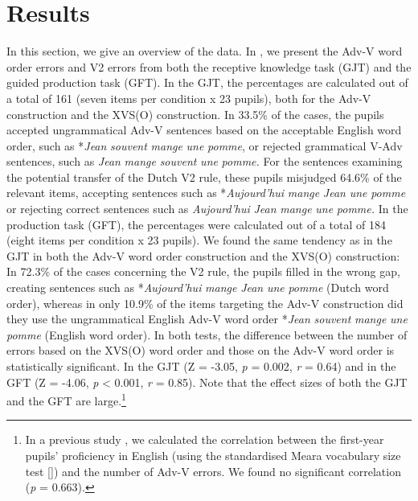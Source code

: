 \documentclass[output=paper,modfonts,nonflat, newtxmath]{langsci/langscibook}
\begin{document}
\section{Results}
\label{sec:stadt:4}

In this section, we give an overview of the data. In , we present the Adv-V word order errors and V2 errors from both the receptive knowledge task (GJT) and the guided production task (GFT). In the GJT, the percentages are calculated out of a total of 161 (seven items per condition x 23 pupils), both for the Adv-V construction and the XVS(O) construction. In 33.5\% of the cases, the pupils accepted ungrammatical Adv-V sentences based on the acceptable English word order, such as *\textit{Jean} \textit{souvent} \textit{mange} \textit{une} \textit{pomme}, or rejected grammatical V-Adv sentences, such as \textit{Jean} \textit{mange} \textit{souvent} \textit{une} \textit{pomme.} For the sentences examining the potential transfer of the Dutch V2 rule, these pupils misjudged 64.6\% of the relevant items, accepting sentences such as *\textit{Aujourd’hui} \textit{mange} \textit{Jean} \textit{une} \textit{pomme} or rejecting correct sentences such as \textit{Aujourd’hui} \textit{Jean} \textit{mange} \textit{une} \textit{pomme.} In the production task (GFT), the percentages were calculated out of a total of 184 (eight items per condition x 23 pupils). We found the same tendency as in the GJT in both the Adv-V word order construction and the XVS(O) construction: In 72.3\% of the cases concerning the V2 rule, the pupils filled in the wrong gap, creating sentences such as *\textit{Aujourd’hui} \textit{mange} \textit{Jean} \textit{une} \textit{pomme} (Dutch word order), whereas in only 10.9\% of the items targeting the Adv-V construction did they use the ungrammatical English Adv-V word order *\textit{Jean} \textit{souvent} \textit{mange} \textit{une} \textit{pomme} (English word order). In both tests, the difference between the number of errors based on the XVS(O) word order and those on the Adv-V word order is statistically significant. In the GJT (Z = -3.05, \textit{p} = 0.002, \textit{r} = 0.64) and in the GFT (Z = -4.06, \textit{p} < 0.001, \textit{r} = 0.85). Note that the effect sizes of both the GJT and the GFT are large.\footnote{ \textrm{In a previous study \citep{StadtEtAl2018Longitudinal}, we calculated the correlation between the first-year pupils’ proficiency in English (using the standardised Meara vocabulary size test [\citealt{Meara2010}]) and the number of Adv-V errors. We found no significant correlation (}\textrm{\textit{p}} \textrm{= 0.663).}}
\end{document}
